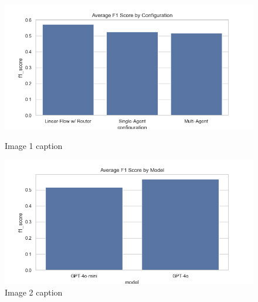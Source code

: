             \begin{figure}[h]
              \centering
              \begin{minipage}{0.45\textwidth}
                \centering
                \includegraphics[width=\textwidth]{images_exp2/bar_avg_f1_by_configuration.png}
                \caption{Image 1 caption}
                \label{fig:image1}
              \end{minipage}
              \hfill
              \begin{minipage}{0.45\textwidth}
                \centering
                \includegraphics[width=\textwidth]{images_exp2/bar_avg_f1_by_model.png}
                \caption{Image 2 caption}
                \label{fig:image2}
              \end{minipage}
            \end{figure}
            
